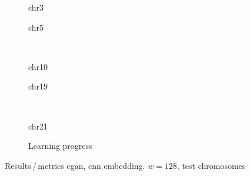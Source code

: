 \begin{figure}[p] %
    \begin{subfigure}{0.45\textwidth}
        \scriptsize
        \caption{chr3}
    \end{subfigure} \hfill
    \begin{subfigure}{0.45\textwidth}
        \scriptsize
        \caption{chr5}
    \end{subfigure}\\[5mm]
    \begin{subfigure}{0.45\textwidth}
        \scriptsize
        \caption{chr10}
    \end{subfigure}\hfill
    \begin{subfigure}{0.45\textwidth}
        \scriptsize
        \caption{chr19}
    \end{subfigure}\\[3mm]
    \centering
    \begin{subfigure}{0.45\textwidth}
        \scriptsize
        \caption{chr21}
    \end{subfigure} \hfill
    \begin{subfigure}{0.45\textwidth}
        \scriptsize
        \caption{Learning progress} \label{fig:results:cGAN128_lossEpochs}
    \end{subfigure}
    \caption{Results\,/\,metrics \acrshort{cgan}, \acrshort{cnn} embedding. $w=128$, test chromosomes}   \label{fig:results:cGAN128_pearson}
\end{figure}
